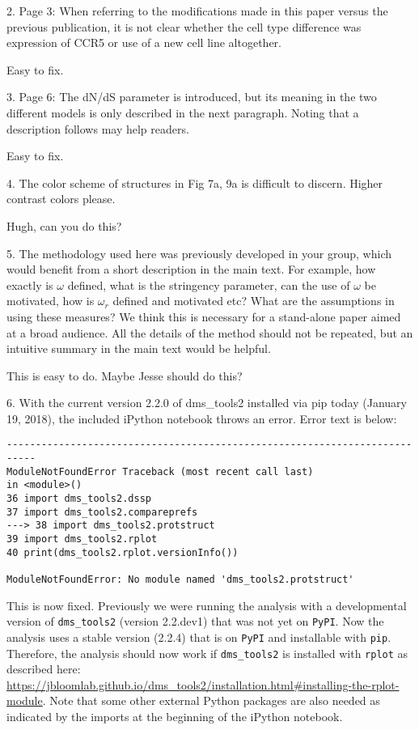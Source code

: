 \documentclass[11pt, oneside]{article}   	%
\begin{document}
2. Page 3: When referring to the modifications made in this paper versus the previous publication, it is not clear whether the cell type difference was expression of CCR5 or use of a new cell line altogether. 

{\color{red}
Easy to fix.
}

3. Page 6: The dN/dS parameter is introduced, but its meaning in the two different models is only described in the next paragraph. Noting that a description follows may help readers. 

{\color{red}
Easy to fix.}

4. The color scheme of structures in Fig 7a, 9a is difficult to discern. Higher contrast colors please. 

{\color{red}
Hugh, can you do this?}

5. The methodology used here was previously developed in your group, which would benefit from a short description in the main text. For example, how exactly is $\omega$ defined, what is the stringency parameter, can the use of $\omega$ be motivated, how is $\omega_r$ defined and motivated etc? What are the assumptions in using these measures? We think this is necessary for a stand-alone paper aimed at a broad audience. All the details of the method should not be repeated, but an intuitive summary in the main text would be helpful. 

{\color{red}
This is easy to do. Maybe Jesse should do this?}

6. With the current version 2.2.0 of dms\_tools2 installed via pip today (January 19, 2018), the included iPython notebook throws an error. Error text is below: 
\begin{verbatim}
--------------------------------------------------------------------------- 
ModuleNotFoundError Traceback (most recent call last) 
in <module>() 
36 import dms_tools2.dssp 
37 import dms_tools2.compareprefs 
---> 38 import dms_tools2.protstruct 
39 import dms_tools2.rplot 
40 print(dms_tools2.rplot.versionInfo()) 

ModuleNotFoundError: No module named 'dms_tools2.protstruct'
\end{verbatim}

{\color{black}
This is now fixed.
Previously we were running the analysis with a developmental version of \texttt{dms\_tools2} (version 2.2.dev1) that was not yet on \texttt{PyPI}.
Now the analysis uses a stable version (2.2.4) that is on \texttt{PyPI} and installable with \texttt{pip}.
Therefore, the analysis should now work if \texttt{dms\_tools2} is installed with \texttt{rplot} as described here: \url{https://jbloomlab.github.io/dms_tools2/installation.html#installing-the-rplot-module}.
Note that some other external Python packages are also needed as indicated by the imports at the beginning of the iPython notebook.
}
\end{document}
